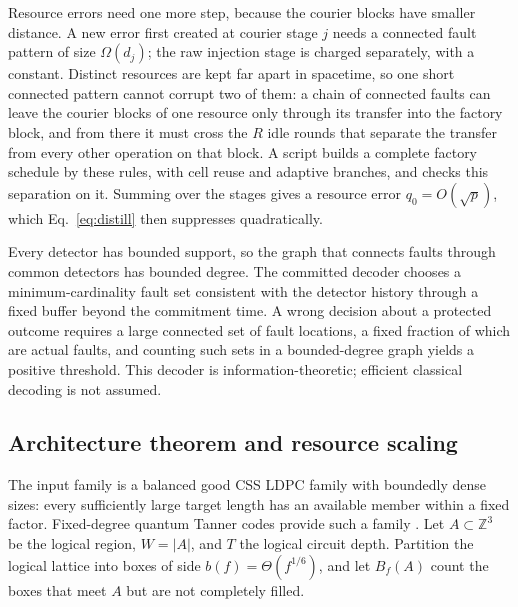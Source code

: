 \documentclass[10pt,a4paper,twocolumn]{article}
\begin{document}
Resource errors need one more step, because the courier blocks have smaller
distance.  A new error first created at courier stage $j$ needs a connected fault
pattern of size $\Omega(d_j)$; the raw injection stage is charged separately,
with a constant.  Distinct resources are kept far apart in spacetime, so one
short connected pattern cannot corrupt two of them: a chain of connected faults
can leave the courier blocks of one resource only through its transfer into the
factory block, and from there it must cross the $R$ idle rounds that separate
the transfer from every other operation on that block.  A script builds a
complete factory schedule by these rules, with cell reuse and adaptive branches,
and checks this separation on it.  Summing over the stages gives a resource
error $q_0=O(\sqrt p)$, which Eq.~\eqref{eq:distill} then suppresses
quadratically.

Every detector has bounded support, so the graph that connects faults through
common detectors has bounded degree.  The committed decoder chooses a
minimum-cardinality fault set consistent with the detector history through a
fixed buffer beyond the commitment time.  A wrong decision about a protected
outcome requires a large connected set of fault locations, a fixed fraction of
which are actual faults, and counting such sets in a bounded-degree graph yields
a positive threshold.  This decoder is information-theoretic; efficient
classical decoding is not assumed.

\subsection{Architecture theorem and resource scaling}
\label{sec:architecture}
The input family is a balanced good CSS LDPC family with boundedly dense sizes:
every sufficiently large target length has an available member within a fixed
factor.  Fixed-degree quantum Tanner codes provide such a family
\cite{LeverrierZemorTanner,DinurLTC}.  Let $A\subset\mathbb Z^3$ be the logical
region, $W=|A|$, and $T$ the logical circuit depth.  Partition the logical
lattice into boxes of side $b(f)=\Theta(f^{1/6})$, and let $B_f(A)$ count the
boxes that meet $A$ but are not completely filled.
\end{document}
